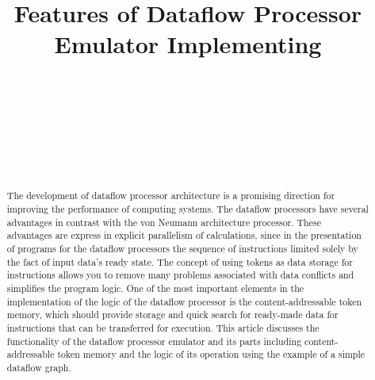\documentclass[
11pt,%
tightenlines,%
twoside,%
onecolumn,%
nofloats,%
nobibnotes,%
nofootinbib,%
superscriptaddress,%
noshowpacs,%
centertags]%
{revtex4}
\begin{document}

\title{Features of Dataflow Processor Emulator Implementing}

\author{~}

\author{~}

\author{~}

\author{~}



\begin{abstract}
The development of dataflow processor architecture is a promising direction for improving the performance of computing systems.
The dataflow processors have several advantages in contrast with the von Neumann architecture processor.
These advantages are express in explicit parallelism of calculations, since in the presentation of programs for the dataflow processors the sequence of instructions limited solely by the fact of input data’s ready state.
The concept of using tokens as data storage for instructions allows you to remove many problems associated with data conflicts and simplifies the program logic.
One of the most important elements in the implementation of the logic of the dataflow processor is the content-addressable token memory, which should provide storage and quick search for ready-made data for instructions that can be transferred for execution.
This article discusses the functionality of the dataflow processor emulator and its parts including content-addressable token memory and the logic of its operation using the example of a simple dataflow graph.
\end{abstract}
\end{document}
